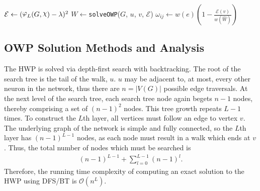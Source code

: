 \documentclass[journal]{IEEEtran}
\DeclareRobustCommand{\rchi}{{\mathpalette\irchi\relax}}
\newcommand{\irchi}[2]{\raisebox{\depth}{$#1\chi$}}
\DeclareRobustCommand{\rvarphi}{{\mathpalette\irvarphi\relax}}
\newcommand{\irvarphi}[2]{\raisebox{\depth}{$#1\varphi$}}
\begin{document}
\begin{algorithmic}[1]
	
	\For {$(\rchi, \lambda) \in X$} 
		\State $\mathcal{E} \gets (\rvarphi_L(G,\rchi)-\lambda)^2$ 
		 
			 
				\State $W\gets$\texttt{solveOWP}($G$, $u$, $v$, $\mathcal{E}$)
				 
					\State $\omega_{ij}\gets w(e) \left(1 - \frac{\mathcal{E}(v)}{w(\hat{W})}\right)$
				\EndFor
			\EndFor
		\EndFor
	\EndFor
	\State \Return{($\omega$)}
	\EndProcedure
\end{algorithmic}



\subsection{OWP Solution Methods and Analysis}

	The HWP is solved via depth-first search with backtracking. The root of the search tree is the tail of the walk, $u$. $u$ may be adjacent to, at most, every other neuron in the network, thus there are $n=|V(G)|$ possible edge traversals. At the next level of the search tree, each search tree node again begets $n-1$ nodes, thereby comprising a set of $(n-1)^2$ nodes. This tree growth repeats $L-1$ times. To construct the $L$th layer, all vertices must follow an edge to vertex $v$. The underlying graph of the network is simple and fully connected, so the $L$th layer has $(n-1)^{L-1}$ nodes, as each node must result in a walk which ends at $v$. Thus, the total number of nodes which must be searched is 
	\begin{align}
	(n-1)^{L-1} +\sum_{l=0}^{L-1} (n-1)^{l}.
	\end{align}	
	\noindent Therefore, the running time complexity of computing an exact solution to the HWP using DFS/BT is $\mathcal{O}(n^L)$.




\end{document}
